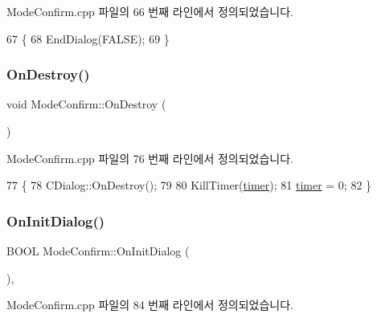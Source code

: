 Mode\+Confirm.\+cpp 파일의 66 번째 라인에서 정의되었습니다.


\begin{DoxyCode}
67 \{
68   EndDialog(FALSE);
69 \}
\end{DoxyCode}
\mbox{\label{class_mode_confirm_a74d3691e5fe1cbe376f082a431de8c43}} 
\subsubsection{\texorpdfstring{On\+Destroy()}{OnDestroy()}}
{\footnotesize\ttfamily void Mode\+Confirm\+::\+On\+Destroy (\begin{DoxyParamCaption}{ }\end{DoxyParamCaption})\hspace{0.3cm}{\ttfamily [protected]}}



Mode\+Confirm.\+cpp 파일의 76 번째 라인에서 정의되었습니다.


\begin{DoxyCode}
77 \{
78   CDialog::OnDestroy();
79   
80   KillTimer(\mbox{\hyperlink{class_mode_confirm_a14129767fe1e52b1779e533b3dc3953d}{timer}});
81   \mbox{\hyperlink{class_mode_confirm_a14129767fe1e52b1779e533b3dc3953d}{timer}} = 0;
82 \}
\end{DoxyCode}
\mbox{\label{class_mode_confirm_a9ff77c7ebd8b567013ca1ef1dee00b46}} 
\subsubsection{\texorpdfstring{On\+Init\+Dialog()}{OnInitDialog()}}
{\footnotesize\ttfamily B\+O\+OL Mode\+Confirm\+::\+On\+Init\+Dialog (\begin{DoxyParamCaption}{ }\end{DoxyParamCaption})\hspace{0.3cm}{\ttfamily [protected]}, {\ttfamily [virtual]}}



Mode\+Confirm.\+cpp 파일의 84 번째 라인에서 정의되었습니다.


